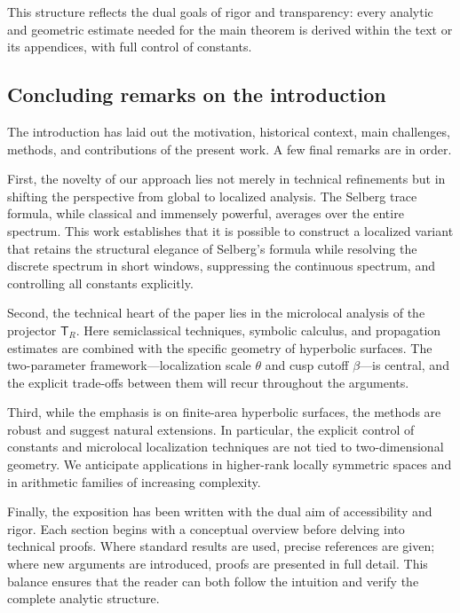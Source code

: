This structure reflects the dual goals of rigor and transparency: every analytic and
geometric estimate needed for the main theorem is derived within the text or its
appendices, with full control of constants.

\subsection{Concluding remarks on the introduction}\label{subsec:intro-conclusion}

The introduction has laid out the motivation, historical context, main challenges,
methods, and contributions of the present work. A few final remarks are in order.

First, the novelty of our approach lies not merely in technical refinements but in
shifting the perspective from global to localized analysis. The Selberg trace formula,
while classical and immensely powerful, averages over the entire spectrum. This work
establishes that it is possible to construct a localized variant that retains the
structural elegance of Selberg’s formula while resolving the discrete spectrum in
short windows, suppressing the continuous spectrum, and controlling all constants
explicitly.

Second, the technical heart of the paper lies in the microlocal analysis of the
projector $\mathsf{T}_R$. Here semiclassical techniques, symbolic calculus, and
propagation estimates are combined with the specific geometry of hyperbolic surfaces.
The two-parameter framework---localization scale $\theta$ and cusp cutoff $\beta$---is
central, and the explicit trade-offs between them will recur throughout the arguments.

Third, while the emphasis is on finite-area hyperbolic surfaces, the methods are robust
and suggest natural extensions. In particular, the explicit control of constants and
microlocal localization techniques are not tied to two-dimensional geometry. We
anticipate applications in higher-rank locally symmetric spaces and in arithmetic
families of increasing complexity.

Finally, the exposition has been written with the dual aim of accessibility and rigor.
Each section begins with a conceptual overview before delving into technical proofs.
Where standard results are used, precise references are given; where new arguments are
introduced, proofs are presented in full detail. This balance ensures that the reader
can both follow the intuition and verify the complete analytic structure.

